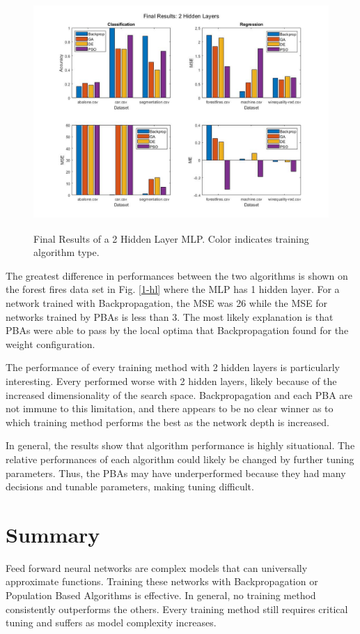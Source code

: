 \documentclass[twoside,11pt]{article}
\begin{document}
	\begin{figure}[h]
		\centering
		\includegraphics[height=3.5in]{FINAL_FIGS/2_hl.jpg}
		\caption{Final Results of a 2 Hidden Layer MLP. Color indicates training algorithm type.}
		\label{2-hl}
	\end{figure}

	The greatest difference in performances between the two algorithms is shown on the forest fires data set in Fig. \ref{1-hl} where the MLP has 1 hidden layer.
	For a network trained with Backpropagation, the MSE was 26 while the MSE for networks trained by PBAs is less than 3.
	The most likely explanation is that PBAs were able to pass by the local optima that Backpropagation found for the weight configuration.

	The performance of every training method with 2 hidden layers is particularly interesting. Every performed worse with 2 hidden layers, likely because of the increased dimensionality of the search space. Backpropagation and each PBA are not immune to this limitation, and there appears to be no clear winner as to which training method performs the best as the network depth is increased.

	In general, the results show that algorithm performance is highly situational. The relative performances of each algorithm could likely be changed by further tuning parameters. Thus, the PBAs may have underperformed because they had many decisions and tunable parameters, making tuning difficult.


\section{Summary}

Feed forward neural networks are complex models that can universally approximate functions. Training these networks with Backpropagation or Population Based Algorithms is effective. In general, no training method consistently outperforms the others. Every training method still requires critical tuning and suffers as model complexity increases.

\newpage


\end{document}
